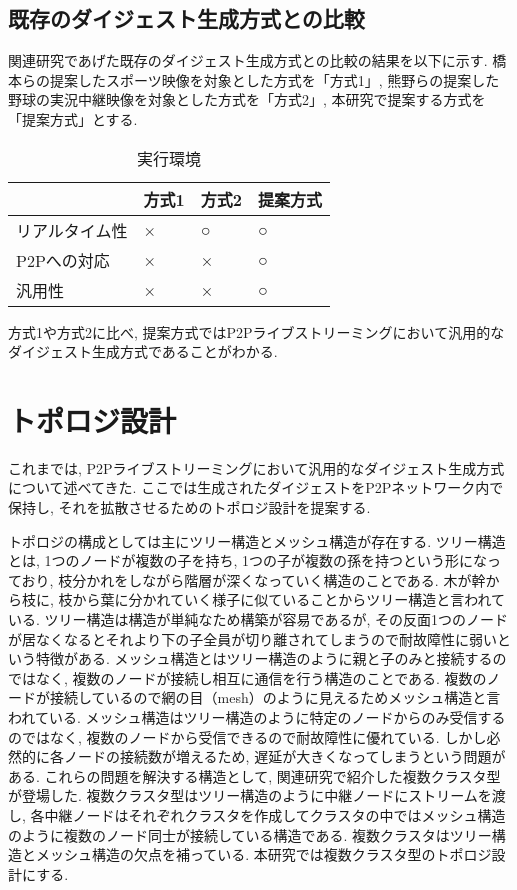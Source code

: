 \subsection{既存のダイジェスト生成方式との比較}
関連研究であげた既存のダイジェスト生成方式との比較の結果を以下に示す. 橋本らの提案したスポーツ映像を対象とした方式を「方式1」, 熊野らの提案した野球の実況中継映像を対象とした方式を「方式2」, 本研究で提案する方式を「提案方式」とする.

\begin{table}[h]
  \caption{実行環境}
  \label{tbl:EvalEnv}
  \centering
      {\small
        \begin{tabular}{|l|l|l|l|}
          \hline
          & 方式1 & 方式2 & 提案方式 \\ \hline \hline
          リアルタイム性 & × & ○ & ○ \\ \hline
          P2Pへの対応 & × & × & ○ \\ \hline
          汎用性 & × & × & ○ \\ \hline
        \end{tabular}
      }
\end{table}

方式1や方式2に比べ, 提案方式ではP2Pライブストリーミングにおいて汎用的なダイジェスト生成方式であることがわかる.

\section{トポロジ設計}
これまでは, P2Pライブストリーミングにおいて汎用的なダイジェスト生成方式について述べてきた. ここでは生成されたダイジェストをP2Pネットワーク内で保持し, それを拡散させるためのトポロジ設計を提案する.

トポロジの構成としては主にツリー構造とメッシュ構造が存在する. ツリー構造とは, 1つのノードが複数の子を持ち, 1つの子が複数の孫を持つという形になっており, 枝分かれをしながら階層が深くなっていく構造のことである. 木が幹から枝に, 枝から葉に分かれていく様子に似ていることからツリー構造と言われている. ツリー構造は構造が単純なため構築が容易であるが, その反面1つのノードが居なくなるとそれより下の子全員が切り離されてしまうので耐故障性に弱いという特徴がある. メッシュ構造とはツリー構造のように親と子のみと接続するのではなく, 複数のノードが接続し相互に通信を行う構造のことである. 複数のノードが接続しているので網の目（mesh）のように見えるためメッシュ構造と言われている. メッシュ構造はツリー構造のように特定のノードからのみ受信するのではなく, 複数のノードから受信できるので耐故障性に優れている. しかし必然的に各ノードの接続数が増えるため, 遅延が大きくなってしまうという問題がある. これらの問題を解決する構造として, 関連研究で紹介した複数クラスタ型が登場した. 複数クラスタ型はツリー構造のように中継ノードにストリームを渡し, 各中継ノードはそれぞれクラスタを作成してクラスタの中ではメッシュ構造のように複数のノード同士が接続している構造である. 複数クラスタはツリー構造とメッシュ構造の欠点を補っている. 本研究では複数クラスタ型のトポロジ設計にする.

